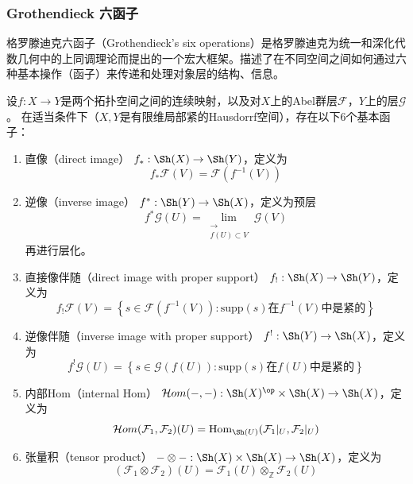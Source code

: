 \subsubsection{Grothendieck 六函子}
格罗滕迪克六函子（Grothendieck's six operations）是格罗滕迪克为统一和深化代数几何中的上同调理论而提出的一个宏大框架。描述了在不同空间之间如何通过六种基本操作（函子）来传递和处理对象层的结构、信息。

\begin{definition}
    设$f:X\to Y$是两个拓扑空间之间的连续映射，以及对$X$上的Abel群层$\mathcal{F}$，$Y$上的层$\mathcal{G}$。
    在适当条件下（$X,Y$是有限维局部紧的Hausdorrf空间），存在以下6个基本函子：
    \begin{enumerate}
        \item 直像（direct image） $f_*:\Sh(X)\to \Sh(Y) $，定义为
              \begin{equation*}
                  f_*\mathcal{F}(V)=\mathcal{F}(f^{-1}(V))
              \end{equation*}
        \item 逆像（inverse image） $f^{*}:\Sh(Y)\to \Sh(X)$，定义为预层
              \begin{equation*}
                  f^{*}\mathcal{G}(U)=\lim_{\substack{\longrightarrow\\f(U)\subset V}} \mathcal{G}(V)
              \end{equation*}
              再进行层化。
        \item 直接像伴随（direct image with proper support） $f_!:\Sh(X)\to \Sh(Y)$，定义为
              \begin{equation*}
                  f_!\mathcal{F}(V)=\left\{s\in \mathcal{F}(f^{-1}(V)):\text{supp}(s)\text{在}f^{-1}(V)\text{中是紧的}\right\}
              \end{equation*}
        \item 逆像伴随（inverse image with proper support） $f^!:\Sh(Y)\to \Sh(X)$，定义为
              \begin{equation*}
                  f^!\mathcal{G}(U)=\left\{s\in \mathcal{G}(f(U)):\text{supp}(s)\text{在}f(U)\text{中是紧的}\right\}
              \end{equation*}
        \item 内部Hom（internal Hom） $\mathcal{H}om(-,-):\Sh
                  (X)^{\op}\times \Sh(X)\to \Sh(X)$，定义为
              \begin{equation*}
                  \mathcal{H}om(\mathcal{F}_1,\mathcal{F}_2)(U)=\operatorname{Hom}_{\Sh(U)}(\mathcal{F}_1|_U,\mathcal{F}_2|_U)
              \end{equation*}
        \item 张量积（tensor product） $-\otimes-:\Sh(X)\times \Sh(X)\to \Sh(X)$，定义为
              \begin{equation*}
                  (\mathcal{F}_1\otimes \mathcal{F}_2)(U)=\mathcal{F}_1(U)\otimes_{\mathbb{Z}}\mathcal{F}_2(U)
              \end{equation*}
    \end{enumerate}
\end{definition}
